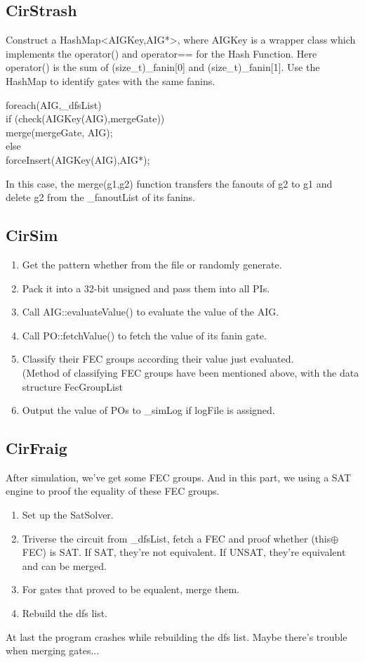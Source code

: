 \documentclass{article}
\begin{document}
\subsection{CirStrash}
Construct a {\cs HashMap<AIGKey,AIG*>}, where {\cs AIGKey} is a wrapper class which implements the {\cs operator()}
and {\cs operator==} for the Hash Function. 
Here {\cs operator()} is the sum of {\cs (size\_t)\_fanin[0]} and {\cs (size\_t)\_fanin[1]}.
Use the HashMap to identify gates with the same fanins.
\begin{framed}
\cs foreach(AIG,\_dfsList)\\
\indent\quad if (check(AIGKey(AIG),mergeGate))\\
\indent\qquad merge(mergeGate, AIG);\\
\indent\quad else\\
\indent\qquad forceInsert(AIGKey(AIG),AIG*);
\end{framed}
In this case, the {\cs merge(g1,g2)} function transfers the fanouts of g2 to g1 
and delete g2 from the {\cs \_fanoutList} of its fanins.
\subsection{CirSim}
\begin{enumerate}
\item Get the pattern whether from the file or randomly generate. 
\item Pack it into a 32-bit {\cs unsigned} and pass them into all PIs.
\item Call {\cs AIG::evaluateValue()} to evaluate the value of the AIG.
\item Call {\cs PO::fetchValue()} to fetch the value of its fanin gate.
\item Classify their FEC groups according their value just evaluated.\\
(Method of classifying FEC groups have been mentioned above, with the data structure {\cs FecGroupList}
\item Output the value of POs to {\cs \_simLog} if logFile is assigned.
\end{enumerate}
\subsection{CirFraig}
After simulation, we've get some FEC groups. 
And in this part, we using a SAT engine to proof the equality of these FEC groups.
\begin{enumerate}
\item Set up the SatSolver.
\item Triverse the circuit from {\cs \_dfsList}, fetch a FEC and proof whether ({\cs *this}$\oplus$FEC) is SAT.
If SAT, they're not equivalent. If UNSAT, they're equivalent and can be merged.
\item For gates that proved to be equalent, merge them.
\item Rebuild the dfs list.
\end{enumerate}
At last the program crashes while rebuilding the dfs list. Maybe there's trouble when merging gates...
\end{document}

